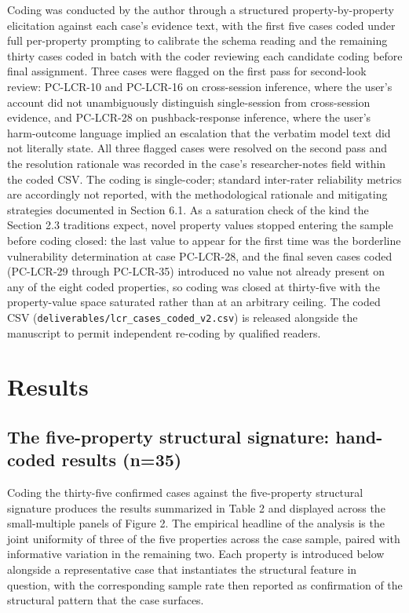 \documentclass[11pt]{article}
\begin{document}
Coding was conducted by the author through a structured property-by-property elicitation against each case's evidence text, with the first five cases coded under full per-property prompting to calibrate the schema reading and the remaining thirty cases coded in batch with the coder reviewing each candidate coding before final assignment. Three cases were flagged on the first pass for second-look review: PC-LCR-10 and PC-LCR-16 on cross-session inference, where the user's account did not unambiguously distinguish single-session from cross-session evidence, and PC-LCR-28 on pushback-response inference, where the user's harm-outcome language implied an escalation that the verbatim model text did not literally state. All three flagged cases were resolved on the second pass and the resolution rationale was recorded in the case's researcher-notes field within the coded CSV. The coding is single-coder; standard inter-rater reliability metrics are accordingly not reported, with the methodological rationale and mitigating strategies documented in Section 6.1. As a saturation check of the kind the Section 2.3 traditions expect, novel property values stopped entering the sample before coding closed: the last value to appear for the first time was the borderline vulnerability determination at case PC-LCR-28, and the final seven cases coded (PC-LCR-29 through PC-LCR-35) introduced no value not already present on any of the eight coded properties, so coding was closed at thirty-five with the property-value space saturated rather than at an arbitrary ceiling. The coded CSV (\texttt{deliverables/lcr\_cases\_coded\_v2.csv}) is released alongside the manuscript to permit independent re-coding by qualified readers.

\FloatBarrier

\section{Results}

\subsection{The five-property structural signature: hand-coded results (n=35)}

Coding the thirty-five confirmed cases against the five-property structural signature produces the results summarized in Table 2 and displayed across the small-multiple panels of Figure 2. The empirical headline of the analysis is the joint uniformity of three of the five properties across the case sample, paired with informative variation in the remaining two. Each property is introduced below alongside a representative case that instantiates the structural feature in question, with the corresponding sample rate then reported as confirmation of the structural pattern that the case surfaces.
\end{document}
